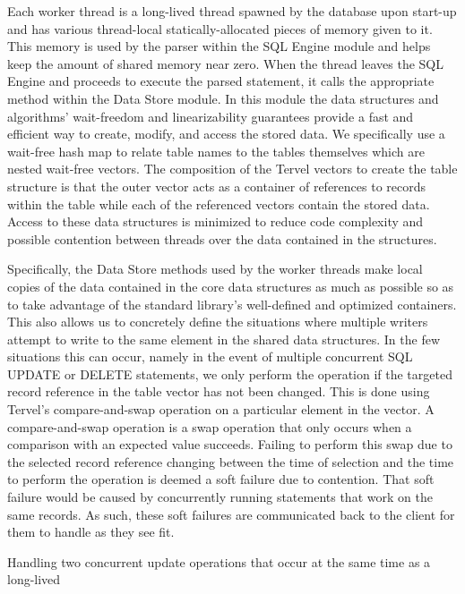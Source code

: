 \documentclass[letter,11pt]{article}
\begin{document}
Each worker thread is a long-lived thread spawned by the database upon start-up 
and has various thread-local statically-allocated pieces of memory given to it.
This memory is used by the parser within the SQL Engine module and helps keep the amount
of shared memory near zero. When the thread leaves the SQL Engine and proceeds to 
execute the parsed statement, it calls the appropriate method within the Data Store 
module. In this module the data structures and algorithms' wait-freedom and linearizability 
guarantees provide a fast and efficient way to create, modify, and access the stored data.  
We specifically use a wait-free hash map to relate table names to the tables themselves 
which are nested wait-free vectors. The composition of the Tervel vectors to create 
the table structure is that the outer vector acts as a container of references 
to records within the table while each of the referenced vectors contain the stored 
data. Access to these data structures is minimized to reduce code complexity and 
possible contention between threads over the data contained in the structures.
\par\vspace{\baselineskip}
Specifically, the Data Store methods used by the worker threads make local copies of 
the data contained in the core data structures as much as possible so as to take 
advantage of the standard library's well-defined and optimized containers. This also 
allows us to concretely define the situations where multiple writers attempt to write 
to the same element in the shared data structures. In the few situations this can occur, 
namely in the event of multiple concurrent SQL UPDATE or DELETE statements, we only perform
the operation if the targeted record reference in the table vector has not been changed. 
This is done using Tervel's compare-and-swap operation on a particular element in the 
vector. A compare-and-swap operation is a swap operation that only occurs when a comparison 
with an expected value succeeds. Failing to perform this swap due to the selected 
record reference changing between the time of selection and the time to perform the operation 
is deemed a soft failure due to contention. That soft failure would be caused by concurrently
running statements that work on the same records. As such, these soft failures are communicated
back to the client for them to handle as they see fit.
\par\vspace{\baselineskip}
Handling two concurrent update operations that occur at the same time as a long-lived 
\end{document}
